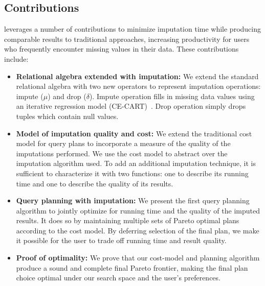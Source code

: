 \subsection{Contributions}
\ProjectName{} leverages a number of contributions to minimize imputation time while producing comparable results to traditional approaches,
increasing productivity for users who frequently encounter missing values in their data. These contributions include:
\begin{itemize}
\item \textbf{Relational algebra extended with imputation:}
  We extend the standard relational algebra with two new operators to represent imputation operations: impute ($\mu$) and drop ($\delta$).
  Impute operation fills in missing data values using an iterative regression model (CE-CART)~\cite{burgette2010multiple}.
  Drop operation simply drops tuples which contain null values.
\item \textbf{Model of imputation quality and cost:}
  We extend the traditional cost model for query plans to incorporate a measure of the quality of the imputations performed.
  We use the cost model to abstract over the imputation algorithm used.
  To add an additional imputation technique, it is sufficient to characterize it with two functions: one to describe its running time and one to describe the quality of its results.
\item \textbf{Query planning with imputation:}
  We present the first query planning algorithm to jointly optimize for running time and the quality of the imputed results.
  It does so by maintaining multiple sets of Pareto optimal plans according to the cost model.
  By deferring selection of the final plan, we make it possible for the user to trade off running time and result quality.
\item \textbf{Proof of optimality:}
 We prove that our cost-model and planning algorithm produce a sound and complete final Pareto frontier, making the final plan choice optimal under our search space and the user's preferences.
\end{itemize}




